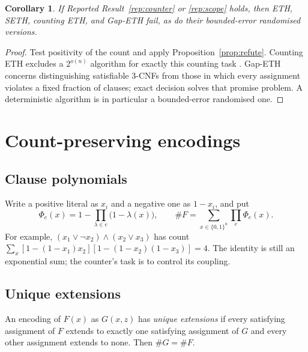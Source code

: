 \documentclass[11pt,reqno]{amsart}
\numberwithin{equation}{section}
\theoremstyle{plain}
\newtheorem{corollary}[theorem]{Corollary}
\theoremstyle{definition}
\theoremstyle{remark}
\begin{document}
\begin{corollary}\label{cor:hypotheses}
If Reported Result~\ref{rep:counter} or \ref{rep:scope} holds, then ETH, SETH,
counting ETH, and Gap-ETH fail, as do their bounded-error randomised versions.
\end{corollary}
\begin{proof}
Test positivity of the count and apply Proposition~\ref{prop:refute}.
Counting ETH excludes a $2^{o(n)}$ algorithm for exactly this counting task
\cite{DHM}. Gap-ETH concerns distinguishing satisfiable 3-CNFs from those in
which every assignment violates a fixed fraction of clauses; exact decision
solves that promise problem. A deterministic algorithm is in particular a
bounded-error randomised one.
\end{proof}

\section{Count-preserving encodings}\label{sec:encodings}

\subsection{Clause polynomials}
Write a positive literal as $x_i$ and a negative one as $1-x_i$, and put
\begin{equation}\label{eq:clause-polynomial}
 \Phi_e(x)=1-\prod_{\lambda\in e}\bigl(1-\lambda(x)\bigr),\qquad
 \#F=\sum_{x\in\{0,1\}^n}\prod_e\Phi_e(x).
\end{equation}
For example, $(x_1\lor\neg x_2)\land(x_2\lor x_3)$ has count
$\sum_x[1-(1-x_1)x_2][1-(1-x_2)(1-x_3)]=4$. The identity is still an
exponential sum; the counter's task is to control its coupling.

\subsection{Unique extensions}
An encoding of $F(x)$ as $G(x,z)$ has \emph{unique extensions} if every
satisfying assignment of $F$ extends to exactly one satisfying assignment of
$G$ and every other assignment extends to none. Then $\#G=\#F$.
\end{document}
